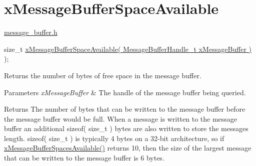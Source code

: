 \hypertarget{group__x_message_buffer_space_available}{}\section{x\+Message\+Buffer\+Space\+Available}
\label{group__x_message_buffer_space_available}
\hyperlink{message__buffer_8h}{message\+\_\+buffer.\+h} 
\begin{DoxyPre}
size\_t \hyperlink{message__buffer_8h_a9f1e75a283ef603e914e10ae354e5ab8}{xMessageBufferSpaceAvailable( MessageBufferHandle\_t xMessageBuffer )} );
\end{DoxyPre}
 Returns the number of bytes of free space in the message buffer.


\begin{DoxyParams}{Parameters}
{\em x\+Message\+Buffer} & The handle of the message buffer being queried.\\
\hline
\end{DoxyParams}
\begin{DoxyReturn}{Returns}
The number of bytes that can be written to the message buffer before the message buffer would be full. When a message is written to the message buffer an additional sizeof( size\+\_\+t ) bytes are also written to store the message\textquotesingle{}s length. sizeof( size\+\_\+t ) is typically 4 bytes on a 32-\/bit architecture, so if \hyperlink{message__buffer_8h_a572622608a32242b1d7a922b71f96658}{x\+Message\+Buffer\+Spaces\+Available()} returns 10, then the size of the largest message that can be written to the message buffer is 6 bytes. 
\end{DoxyReturn}

